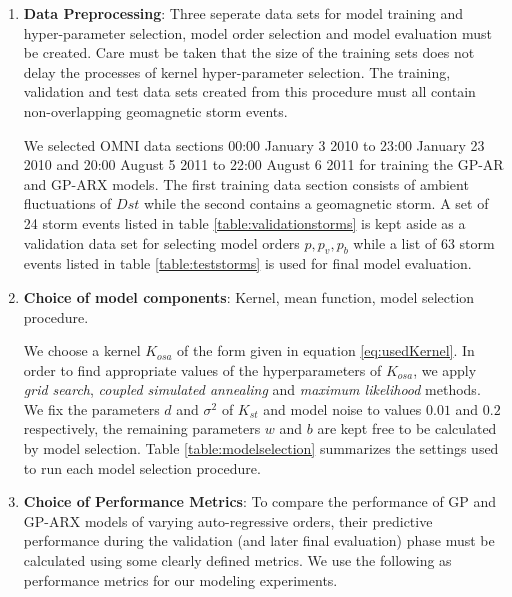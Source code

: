 \documentclass{article}
\begin{document}
\begin{enumerate}

\item \textbf{Data Preprocessing}: Three seperate data sets for model
  training and hyper-parameter selection, model order selection and
  model evaluation must be created. Care must be taken that the size
  of the training sets does not delay the processes of kernel
  hyper-parameter selection. The training, validation and test data
  sets created from this procedure must all contain non-overlapping
  geomagnetic storm events. 

  We selected OMNI data sections 00:00 January 3 2010 to 23:00 January
  23 2010 and 20:00 August 5 2011 to 22:00 August 6 2011 for training
  the GP-AR and GP-ARX models. The first training data section
  consists of ambient fluctuations of $Dst$ while the second contains
  a geomagnetic storm. A set of 24 storm events listed in table
  \ref{table:validationstorms} is kept aside as a validation data set
  for selecting model orders $p, p_v, p_b$ while a list of 63 storm
  events listed in table \ref{table:teststorms} is used for final
  model evaluation.


\item \textbf{Choice of model components}:  Kernel, mean function, model selection procedure. 

  We choose a kernel $K_{osa}$ of the form given in equation
  \ref{eq:usedKernel}. In order to find appropriate values of the
  hyperparameters of $K_{osa}$, we apply \emph{grid search},
  \emph{coupled simulated annealing} and \emph{maximum likelihood}
  methods. We fix the parameters $d$ and $\sigma^2$ of $K_{st}$ and
  model noise to values $0.01$ and $0.2$ respectively, the remaining
  parameters $w$ and $b$ are kept free to be calculated by model
  selection. Table \ref{table:modelselection} summarizes the settings
  used to run each model selection procedure.

\item \textbf{Choice of Performance Metrics}: To compare the
  performance of GP and GP-ARX models of varying auto-regressive
  orders, their predictive performance during the validation (and
  later final evaluation) phase must be calculated using some clearly
  defined metrics. We use the following as performance metrics for our
  modeling experiments.


\end{enumerate}
\end{document}
